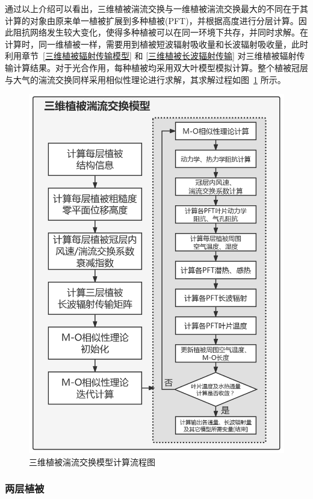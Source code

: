 通过以上介绍可以看出，三维植被湍流交换与一维植被湍流交换最大的不同在于其计算的对象由原来单一植被扩展到多种植被(PFT)，并根据高度进行分层计算。因此阻抗网络发生较大变化，使得多种植被可以在同一环境下共存，并同时求解。在计算时，同一维植被一样，需要用到植被短波辐射吸收量和长波辐射吸收量，此时利用章节~\ref{三维植被辐射传输模型} 和 \ref{三维植被长波辐射传输} 对三维植被辐射传输计算结果。对于光合作用，每种植被均采用双大叶模型模拟计算。整个植被冠层与大气的湍流交换同样采用相似性理论进行求解，其求解过程如图~\ref{fig:三维植被湍流交换模型计算流程图} 所示。
{
  \begin{figure}[htbp]
    \centering
    \includegraphics[width=0.75\linewidth]{Figures/地表湍流交换过程/三维植被湍流交换模型计算流程图_v2.png}
    \caption{三维植被湍流交换模型计算流程图}
    \label{fig:三维植被湍流交换模型计算流程图}
  \end{figure}
}


\subsubsection{两层植被}

